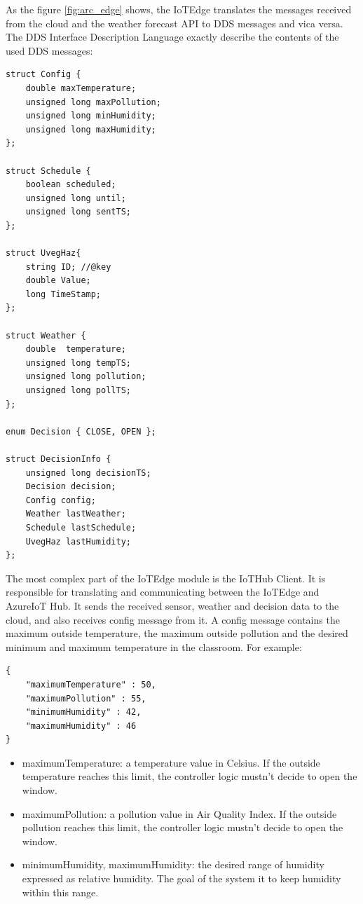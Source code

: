 \documentclass{article}
\begin{document}
As the figure \ref{fig:arc_edge} shows, the IoTEdge translates the messages received from the cloud and the weather forecast API to DDS messages and vica versa. The DDS Interface Description Language exactly describe the contents of the used DDS messages:
\begin{verbatim}
struct Config {
    double maxTemperature;
    unsigned long maxPollution;
    unsigned long minHumidity;
    unsigned long maxHumidity;
};

struct Schedule {
    boolean scheduled;
    unsigned long until;
    unsigned long sentTS;
};

struct UvegHaz{
    string ID; //@key
    double Value;
    long TimeStamp;
};

struct Weather {
    double  temperature;
    unsigned long tempTS;
    unsigned long pollution;
    unsigned long pollTS;
};

enum Decision { CLOSE, OPEN };

struct DecisionInfo {
    unsigned long decisionTS;
    Decision decision;
    Config config;
    Weather lastWeather;
    Schedule lastSchedule;
    UvegHaz lastHumidity;
};
\end{verbatim}

The most complex part of the IoTEdge module is the IoTHub Client. It is responsible for translating and communicating between the IoTEdge and AzureIoT Hub. It sends the received sensor, weather and decision data to the cloud, and also receives config message from it. A config message contains the maximum outside temperature, the maximum outside pollution and the desired minimum and maximum temperature in the classroom. For example:
\begin{verbatim}
{
    "maximumTemperature" : 50,
    "maximumPollution" : 55,
    "minimumHumidity" : 42,
    "maximumHumidity" : 46
}
\end{verbatim}
\begin{itemize}
\item maximumTemperature: a temperature value in Celsius. If the outside temperature reaches this limit, the controller logic mustn't decide to open the window.
\item maximumPollution:  a pollution value in Air Quality Index. If the outside pollution reaches this limit, the controller logic mustn't decide to open the window.
\item minimumHumidity, maximumHumidity: the desired range of humidity expressed as relative humidity. The goal of the system it to keep humidity within this range.
\end{itemize}
\end{document}
